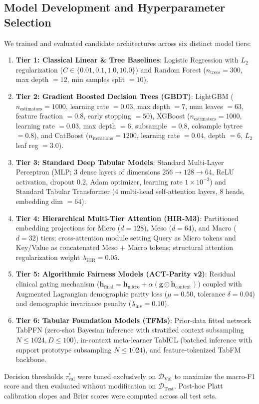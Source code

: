 \documentclass[10pt,journal]{IEEEtran}
\begin{document}
\subsection{Model Development and Hyperparameter Selection}
We trained and evaluated candidate architectures across six distinct model tiers:
\begin{enumerate}
    \item \textbf{Tier 1: Classical Linear \& Tree Baselines}: Logistic Regression with $L_2$ regularization ($C \in \{0.01, 0.1, 1.0, 10.0\}$) and Random Forest ($n_{\text{trees}}=300$, max depth $= 12$, min samples split $= 10$).
    \item \textbf{Tier 2: Gradient Boosted Decision Trees (GBDT)}: LightGBM ($n_{\text{estimators}}=1000$, learning rate $= 0.03$, max depth $= 7$, num leaves $= 63$, feature fraction $= 0.8$, early stopping $= 50$), XGBoost ($n_{\text{estimators}}=1000$, learning rate $= 0.03$, max depth $= 6$, subsample $= 0.8$, colsample bytree $= 0.8$), and CatBoost ($n_{\text{iterations}}=1200$, learning rate $= 0.04$, depth $= 6$, $L_2$ leaf reg $= 3.0$).
    \item \textbf{Tier 3: Standard Deep Tabular Models}: Standard Multi-Layer Perceptron (MLP; 3 dense layers of dimensions $256 \to 128 \to 64$, ReLU activation, dropout $0.2$, Adam optimizer, learning rate $1\times 10^{-3}$) and Standard Tabular Transformer (4 multi-head self-attention layers, 8 heads, embedding dim $= 64$).
    \item \textbf{Tier 4: Hierarchical Multi-Tier Attention (HIR-M3)}: Partitioned embedding projections for Micro ($d=128$), Meso ($d=64$), and Macro ($d=32$) tiers; cross-attention module setting Query as Micro tokens and Key/Value as concatenated Meso + Macro tokens; structural attention regularization weight $\lambda_{\text{HIR}} = 0.05$.
    \item \textbf{Tier 5: Algorithmic Fairness Models (ACT-Parity v2)}: Residual clinical gating mechanism ($\mathbf{h}_{\text{final}} = \mathbf{h}_{\text{micro}} + \alpha(\mathbf{g} \odot \mathbf{h}_{\text{context}})$) coupled with Augmented Lagrangian demographic parity loss ($\mu=0.50$, tolerance $\delta=0.04$) and demographic invariance penalty ($\lambda_{\text{inv}}=0.10$).
    \item \textbf{Tier 6: Tabular Foundation Models (TFMs)}: Prior-data fitted network TabPFN (zero-shot Bayesian inference with stratified context subsampling $N \le 1024, D \le 100$), in-context meta-learner TabICL (batched inference with support prototype subsampling $N \le 1024$), and feature-tokenized TabFM backbone.
\end{enumerate}
Decision thresholds $\tau_{\text{val}}^*$ were tuned exclusively on $\mathcal{D}_{\text{Val}}$ to maximize the macro-F1 score and then evaluated without modification on $\mathcal{D}_{\text{Test}}$. Post-hoc Platt calibration slopes and Brier scores were computed across all test sets.
\end{document}
